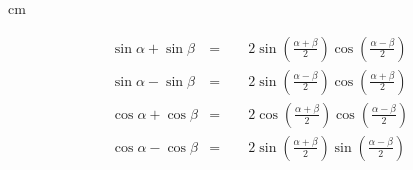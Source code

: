 \begin{frame}
 cm
\begin{proposition}
\[
\begin{array}{rcl}
\sin \alpha +\sin \beta &=&\displaystyle \phantom{-} 2\sin\left( \frac{\alpha+\beta}{2} \right)\cos \left(\frac{\alpha-\beta}{2} \right) \\
\sin \alpha -\sin \beta &=&\displaystyle \phantom{-} 2\sin\left( \frac{\alpha-\beta}{2} \right)\cos \left(\frac{\alpha+\beta}{2} \right) \\
\cos \alpha +\cos \beta &=&\displaystyle\phantom{-} 2\cos\left( \frac{\alpha+\beta}{2} \right)\cos \left(\frac{\alpha-\beta}{2} \right) \\
\cos \alpha -\cos \beta &=&\displaystyle \phantom{-}2\sin\left( \frac{\alpha+\beta}{2} \right)\sin \left(\frac{\alpha-\beta}{2} \right) \\


\end{array}
\]
\end{proposition}


\end{frame}